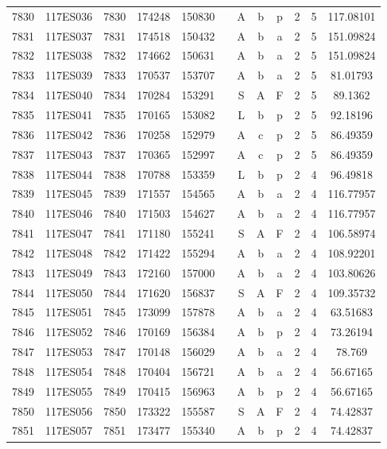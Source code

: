 \begin{tabular}{|*{12}{c|}}
7830 & 117ES036 & 7830 & 174248 & 150830 &  & A & b & p & 2 & 5 & 117.08101 \\ 
7831 & 117ES037 & 7831 & 174518 & 150432 &  & A & b & a & 2 & 5 & 151.09824 \\ 
7832 & 117ES038 & 7832 & 174662 & 150631 &  & A & b & a & 2 & 5 & 151.09824 \\ 
7833 & 117ES039 & 7833 & 170537 & 153707 &  & A & b & a & 2 & 5 & 81.01793 \\ 
7834 & 117ES040 & 7834 & 170284 & 153291 &  & S & A & F & 2 & 5 & 89.1362 \\ 
7835 & 117ES041 & 7835 & 170165 & 153082 &  & L & b & p & 2 & 5 & 92.18196 \\ 
7836 & 117ES042 & 7836 & 170258 & 152979 &  & A & c & p & 2 & 5 & 86.49359 \\ 
7837 & 117ES043 & 7837 & 170365 & 152997 &  & A & c & p & 2 & 5 & 86.49359 \\ 
7838 & 117ES044 & 7838 & 170788 & 153359 &  & L & b & p & 2 & 4 & 96.49818 \\ 
7839 & 117ES045 & 7839 & 171557 & 154565 &  & A & b & a & 2 & 4 & 116.77957 \\ 
7840 & 117ES046 & 7840 & 171503 & 154627 &  & A & b & a & 2 & 4 & 116.77957 \\ 
7841 & 117ES047 & 7841 & 171180 & 155241 &  & S & A & F & 2 & 4 & 106.58974 \\ 
7842 & 117ES048 & 7842 & 171422 & 155294 &  & A & b & a & 2 & 4 & 108.92201 \\ 
7843 & 117ES049 & 7843 & 172160 & 157000 &  & A & b & a & 2 & 4 & 103.80626 \\ 
7844 & 117ES050 & 7844 & 171620 & 156837 &  & S & A & F & 2 & 4 & 109.35732 \\ 
7845 & 117ES051 & 7845 & 173099 & 157878 &  & A & b & a & 2 & 4 & 63.51683 \\ 
7846 & 117ES052 & 7846 & 170169 & 156384 &  & A & b & p & 2 & 4 & 73.26194 \\ 
7847 & 117ES053 & 7847 & 170148 & 156029 &  & A & b & a & 2 & 4 & 78.769 \\ 
7848 & 117ES054 & 7848 & 170404 & 156721 &  & A & b & a & 2 & 4 & 56.67165 \\ 
7849 & 117ES055 & 7849 & 170415 & 156963 &  & A & b & p & 2 & 4 & 56.67165 \\ 
7850 & 117ES056 & 7850 & 173322 & 155587 &  & S & A & F & 2 & 4 & 74.42837 \\ 
7851 & 117ES057 & 7851 & 173477 & 155340 &  & A & b & p & 2 & 4 & 74.42837 \\ 

\end{tabular}
